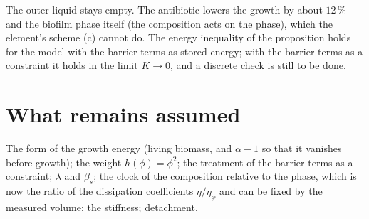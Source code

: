\documentclass[11pt,a4paper]{article}
\begin{document}
The outer liquid stays empty. The antibiotic lowers the growth by about $12\,\%$ and the
biofilm phase itself (the composition acts on the phase), which the element's scheme (c)
cannot do. The energy inequality of the proposition holds for the model with the barrier
terms as stored energy; with the barrier terms as a constraint it holds in the limit $K\to0$,
and a discrete check is still to be done.

\section{What remains assumed}

The form of the growth energy (living biomass, and $\alpha-1$ so that it vanishes before
growth); the weight $h(\phi)=\phi^2$; the treatment of the barrier terms as a constraint;
$\lambda$ and $\beta_s$; the clock of the composition relative to the phase,
which is now the ratio of the dissipation coefficients $\eta/\eta_\phi$ and can be fixed
by the measured volume; the stiffness; detachment.
\end{document}
